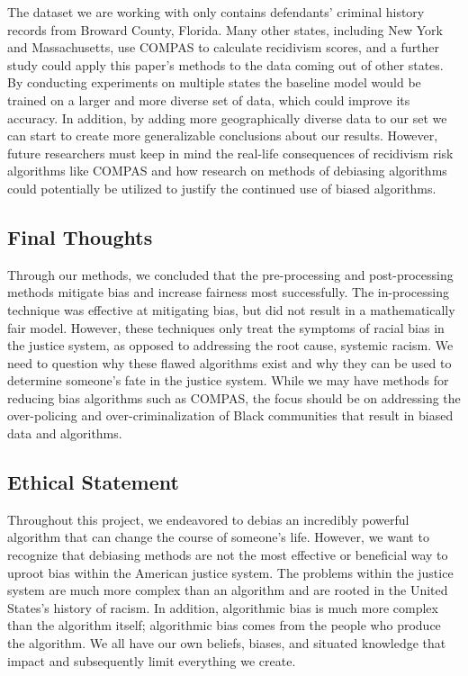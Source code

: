 \documentclass[water,article,submit,moreauthors,pdftex]{mdpi}
\begin{document}
The dataset we are working with only contains defendants' criminal
history records from Broward County, Florida. Many other states,
including New York and Massachusetts, use COMPAS to calculate recidivism
scores, and a further study could apply this paper's methods to the data
coming out of other states. By conducting experiments on multiple states
the baseline model would be trained on a larger and more diverse set of
data, which could improve its accuracy. In addition, by adding more
geographically diverse data to our set we can start to create more
generalizable conclusions about our results. However, future researchers
must keep in mind the real-life consequences of recidivism risk
algorithms like COMPAS and how research on methods of debiasing
algorithms could potentially be utilized to justify the continued use of
biased algorithms.

\hypertarget{final-thoughts}{%
\subsection{Final Thoughts}\label{final-thoughts}}

Through our methods, we concluded that the pre-processing and
post-processing methods mitigate bias and increase fairness most
successfully. The in-processing technique was effective at mitigating
bias, but did not result in a mathematically fair model. However, these
techniques only treat the symptoms of racial bias in the justice system,
as opposed to addressing the root cause, systemic racism. We need to
question why these flawed algorithms exist and why they can be used to
determine someone's fate in the justice system. While we may have
methods for reducing bias algorithms such as COMPAS, the focus should be
on addressing the over-policing and over-criminalization of Black
communities that result in biased data and algorithms.

\hypertarget{ethical-statement}{%
\subsection{Ethical Statement}\label{ethical-statement}}

Throughout this project, we endeavored to debias an incredibly powerful
algorithm that can change the course of someone's life. However, we want
to recognize that debiasing methods are not the most effective or
beneficial way to uproot bias within the American justice system. The
problems within the justice system are much more complex than an
algorithm and are rooted in the United States's history of racism. In
addition, algorithmic bias is much more complex than the algorithm
itself; algorithmic bias comes from the people who produce the
algorithm. We all have our own beliefs, biases, and situated knowledge
that impact and subsequently limit everything we create.
\end{document}
